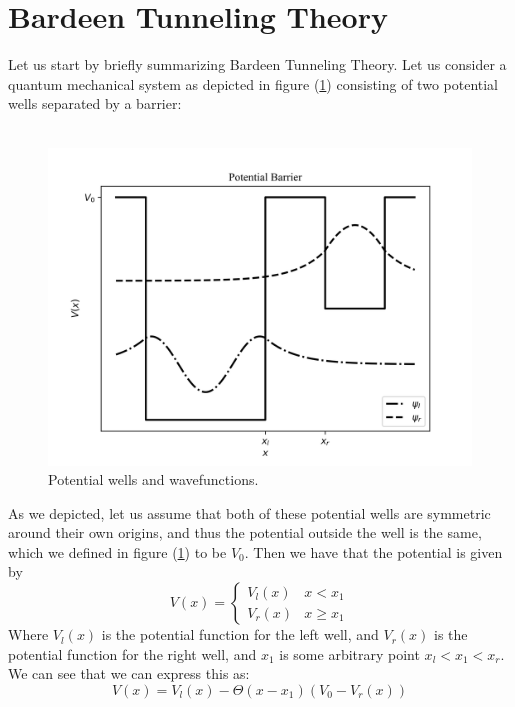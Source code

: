 \documentclass[
  reprint,
  amsmath,amssymb,
  aps
]{revtex4-1}
\begin{document}
\section{\label{sec:level1}Bardeen Tunneling Theory}
Let us start by briefly summarizing Bardeen Tunneling Theory. Let us consider a quantum mechanical system as depicted in 
figure (\ref{fig: bardeen tunneling}) consisting of two potential wells separated by a barrier:\\\\
\begin{figure}[H]
    \centering
    \includegraphics[width=0.9\linewidth]{bardeen_tunneling.png}
    \caption{Potential wells and wavefunctions.}
    \label{fig: bardeen tunneling}
\end{figure}
As we depicted, let us assume that both of these potential wells are symmetric around their own origins, and thus 
the potential outside the well is the same, which we defined in figure (\ref{fig: bardeen tunneling}) to be $V_0$. 
Then we have that the potential is given by
\begin{equation}
    V(x) = \begin{cases}
        V_l(x) & x < x_1\\
        V_r(x) & x \geq x_1
    \end{cases}
\end{equation}
Where $V_l(x)$ is the potential function for the left well, and $V_r(x)$ is the potential function for the right well, and 
$x_1$ is some arbitrary point $x_l<x_1<x_r$. We can see that we can express this as: 
\begin{equation}
    V(x) = V_l(x) - \Theta(x-x_1)(V_0-V_r(x))
\end{equation}
\end{document}
